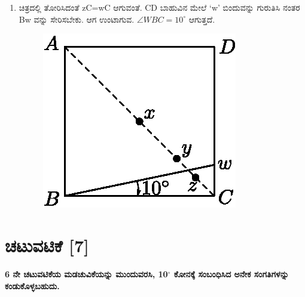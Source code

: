 \begin{enumerate}
\item ಚಿತ್ರದಲ್ಲಿ ತೋರಿಸಿದಂತೆ zC=wC ಆಗುವಂತೆ. CD ಬಾಹುವಿನ ಮೇಲೆ  `w' ಬಿಂದುವನ್ನು ಗುರುತಿಸಿ ನಂತರ Bw ವನ್ನು ಸೇರಿಸಬೇಕು. ಆಗ ಉಂಟಾಗುವ. $\angle WBC = 10^\circ$ ಆಗುತ್ತದೆ. 
\begin{figure}[H]
\centering
\includegraphics[scale=.85]{src/figure/chap1/fig1-12c.eps}
\end{figure}
\end{enumerate}

\section*{ಚಟುವಟಿಕೆ [7]}  \textbf{6 ನೇ ಚಟುವಟಿಕೆಯ ಮಡಚುವಿಕೆಯನ್ನು ಮುಂದುವರಸಿ, 10$^\circ$ ಕೋನಕ್ಕೆ ಸಂಬಂಧಿಸಿದ ಅನೇಕ ಸಂಗತಿಗಳನ್ನು ಕಂಡುಕೊಳ್ಳಬಹುದು.} 

